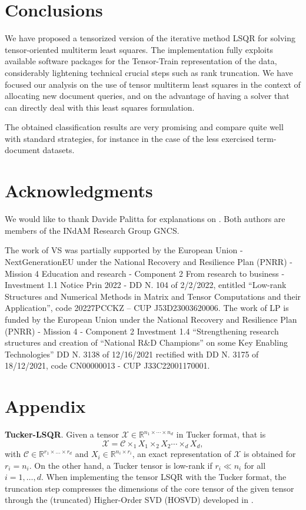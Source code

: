 \documentclass{siamart190516}
\newcommand{\cc}[1]{\mathcal{#1}}
\newcommand{\bb}[1]{\mathbb{#1}}
\begin{document}
\section{Conclusions}\label{sec:conclusions}
We have proposed a tensorized version of the iterative
method LSQR for solving tensor-oriented multiterm least
squares. The implementation fully exploits available software
packages for the Tensor-Train representation of the
data, considerably lightening technical 
crucial steps such as rank truncation.
We have focused our analysis on the use of tensor multiterm
least squares in the context of allocating new document queries,
and on the advantage of having a solver that can directly
deal with this least squares formulation.

The obtained classification results are very promising and compare quite
well with standard strategies, for instance in the case of the less exercised
term-document datasets.




\section{Acknowledgments}
We would like to thank Davide Palitta for explanations on
\cite{Buccietal.24}.
%
 Both authors are members of the INdAM Research
Group GNCS. 

The work of VS
was partially supported by the European Union - NextGenerationEU under the National Recovery and Resilience Plan (PNRR) - Mission 4 Education and research
- Component 2 From research to business - Investment 1.1 Notice Prin 2022 - DD N. 104 of 2/2/2022,
entitled “Low-rank Structures and Numerical Methods in Matrix and Tensor Computations and their
Application”, code 20227PCCKZ – CUP J53D23003620006.
The work of LP is funded by 
the European Union under the National Recovery and Resilience Plan (PNRR) - Mission 4 - Component 2 Investment 1.4 ``Strengthening research structures and creation of ``National R\&D Champions'' on some Key Enabling Technologies'' DD N. 3138 of 12/16/2021 rectified with DD N. 3175 of 18/12/2021, code CN00000013 - CUP J33C22001170001.

\section*{Appendix}
{\bf Tucker-LSQR}. %
Given a tensor $\cc{X}\in\bb{R}^{n_1\times \cdots \times n_d}$  in Tucker format, that is
\begin{equation}
    \cc{X} = \cc{C} \times_1 X_1 \times_2 X_2 \cdots \times_d X_d,
\end{equation}
with $\cc{C}\in\bb{R}^{r_1 \times\ldots \times r_d}$ and $X_i\in\bb{R}^{n_i \times r_i}$, an exact representation of
$\cc{X}$ is obtained for $r_i = n_i$. 
On the other hand, a Tucker tensor is low-rank if $r_i\ll n_i$ for all $i=1,\ldots,d$. When implementing the tensor LSQR with the
Tucker format, the truncation step compresses the dimensions of the core tensor of the given tensor through the (truncated) Higher-Order SVD (HOSVD) developed in \cite{doi:10.1137/S0895479896305696}.
\end{document}
